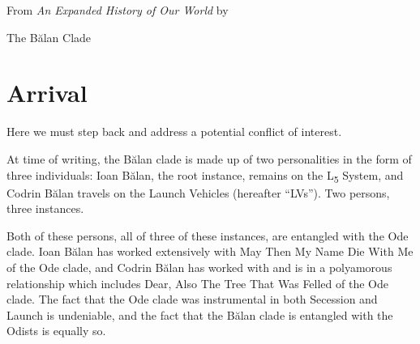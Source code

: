 \documentclass[10pt]{memoir}
\begin{document}
  \vspace{1em}

  From \emph{An Expanded History of Our World} by

  The Bălan Clade

  \vfill

  
  
  
  
  
  
  
  
  
  
  
  
  
  
  
  
  
  
  
  
  
  
  
  
  
  

	\cleartoverso
  \part{Arrival}
  Here we must step back and address a potential conflict of interest.

  At time of writing, the Bălan clade is made up of two personalities in the form of three individuals: Ioan Bălan, the root instance, remains on the L\textsubscript{5} System, and Codrin Bălan travels on the Launch Vehicles (hereafter “LVs”). Two persons, three instances.

  Both of these persons, all of three of these instances, are entangled with the Ode clade. Ioan Bălan has worked extensively with May Then My Name Die With Me of the Ode clade, and Codrin Bălan has worked with and is in a polyamorous relationship which includes Dear, Also The Tree That Was Felled of the Ode clade. The fact that the Ode clade was instrumental in both Secession and Launch is undeniable, and the fact that the Bălan clade is entangled with the Odists is equally so.
\end{document}
